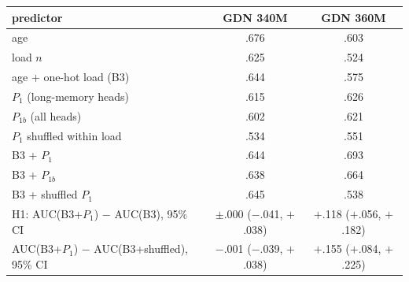 \begin{tabular}{lcc}
\toprule
predictor & GDN 340M & GDN 360M \\
\midrule
age & .676 & .603 \\
load $n$ & .625 & .524 \\
age + one-hot load (B3) & .644 & .575 \\
$P_1$ (long-memory heads) & .615 & .626 \\
$P_{1b}$ (all heads) & .602 & .621 \\
$P_1$ shuffled within load & .534 & .551 \\
B3 + $P_1$ & .644 & .693 \\
B3 + $P_{1b}$ & .638 & .664 \\
B3 + shuffled $P_1$ & .645 & .538 \\
\midrule
H1: AUC(B3+$P_1$) $-$ AUC(B3), 95\% CI & $\pm$.000 ($-$.041, $+$.038) & $+$.118 ($+$.056, $+$.182) \\
AUC(B3+$P_1$) $-$ AUC(B3+shuffled), 95\% CI & $-$.001 ($-$.039, $+$.038) & $+$.155 ($+$.084, $+$.225) \\
\bottomrule
\end{tabular}
